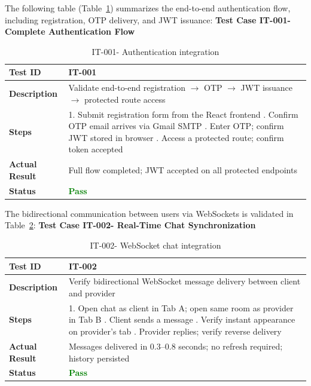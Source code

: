 The following table (Table~\ref{tab:it001}) summarizes the end-to-end authentication flow, including registration, OTP delivery, and JWT issuance:
\textbf{Test Case IT-001- Complete Authentication Flow}

\begin{table}[H]
\caption{IT-001- Authentication integration}
\centering
\begin{tabular}{|l|p{10cm}|}
\hline
\textbf{Test ID} & IT-001 \\
\hline
\textbf{Description} & Validate end-to-end registration $\to$ OTP $\to$ JWT issuance $\to$ protected route access \\
\hline
\textbf{Steps} &
1. Submit registration form from the React frontend \newline
2. Confirm OTP email arrives via Gmail SMTP \newline
3. Enter OTP; confirm JWT stored in browser \newline
4. Access a protected route; confirm token accepted \\
\hline
\textbf{Actual Result} & Full flow completed; JWT accepted on all protected endpoints \\
\hline
\textbf{Status} & \textcolor{green}{\textbf{Pass}} \\
\hline
\end{tabular}

\label{tab:it001}
\end{table}

The bidirectional communication between users via WebSockets is validated in Table~\ref{tab:it002}:
\textbf{Test Case IT-002- Real-Time Chat Synchronization}
\begin{table}[H]
\caption{IT-002- WebSocket chat integration}
\centering
\begin{tabular}{|l|p{10cm}|}
\hline
\textbf{Test ID} & IT-002 \\
\hline
\textbf{Description} & Verify bidirectional WebSocket message delivery between client and provider \\
\hline
\textbf{Steps} &
1. Open chat as client in Tab A; open same room as provider in Tab B \newline
2. Client sends a message \newline
3. Verify instant appearance on provider's tab \newline
4. Provider replies; verify reverse delivery \\
\hline
\textbf{Actual Result} & Messages delivered in 0.3--0.8 seconds; no refresh required; history persisted \\
\hline
\textbf{Status} & \textcolor{green}{\textbf{Pass}} \\
\hline
\end{tabular}

\label{tab:it002}
\end{table}

